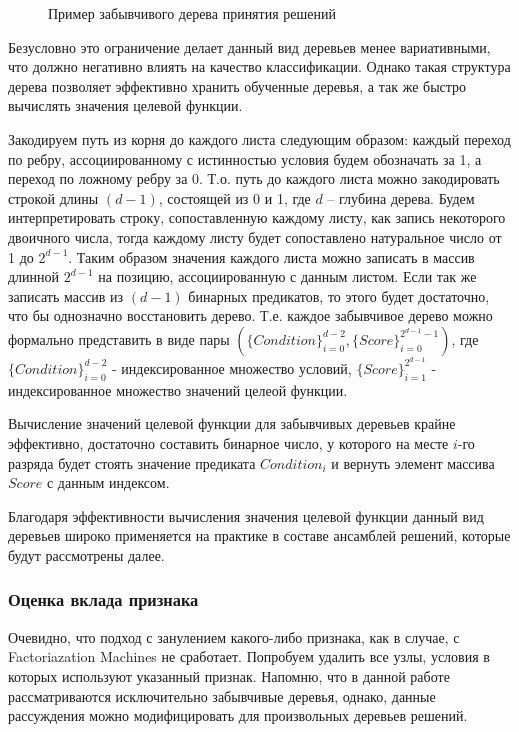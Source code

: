 \documentclass[12pt,a4paper]{report}
\begin{document}
\begin{figure}[H]
\center{\texttt{[image: ot]}}
\caption{Пример забывчивого дерева принятия решений}
\label{ris:ot}
\end{figure}

Безусловно это ограничение делает данный вид деревьев менее вариативными, что должно негативно влиять на качество классификации. Однако такая структура дерева позволяет эффективно хранить обученные деревья, а так же быстро вычислять значения целевой функции.

Закодируем путь из корня до каждого листа следующим образом: каждый переход по ребру, ассоциированному с истинностью условия будем обозначать за 1, а переход по ложному ребру за 0. Т.о. путь до каждого листа можно закодировать строкой длины $(d-1)$, состоящей из 0 и 1, где $d$ -- глубина дерева. Будем интерпретировать строку, сопоставленную каждому листу, как запись некоторого двоичного числа, тогда каждому листу будет сопоставлено натуральное число от 1 до $2^{d-1}$.
Таким образом значения каждого листа можно записать в массив длинной $2^{d-1}$ на позицию, ассоциированную с данным листом. Если так же записать массив из $(d-1)$ бинарных предикатов, то этого будет достаточно, что бы однозначно восстановить дерево.
Т.е. каждое забывчивое дерево можно формально представить в виде пары $(\{Condition\}_{i=0}^{d - 2}, \{Score\}_{i=0}^{2^{d - 1} - 1})$, где $\{Condition\}_{i=0}^{d - 2}$ - индексированное множество условий, $\{Score\}_{i=1}^{2^{d - 1}}$ - индексированное множество значений целеой функции.

Вычисление значений целевой функции для забывчивых деревьев крайне эффективно, достаточно составить бинарное число, у которого на месте $i$-го разряда будет стоять значение предиката $Condition_i$ и вернуть элемент массива $Score$ с данным индексом.

Благодаря эффективности вычисления значения целевой функции данный вид деревьев широко применяется на практике в составе ансамблей решений, которые будут рассмотрены далее.

\subsubsection{Оценка вклада признака}
Очевидно, что подход с занулением какого-либо признака, как в случае, с Factoriazation Machines не сработает. Попробуем удалить все узлы, условия в которых используют указанный признак. Напомню, что в данной работе рассматриваются исключительно забывчивые деревья, однако, данные рассуждения можно модифицировать для произвольных деревьев решений.
\end{document}
